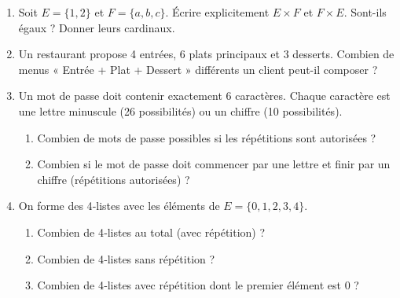 \documentclass[11pt]{article}
\begin{document}
\begin{exercice}
\begin{enumerate}
    \item Soit $E = \{1,2\}$ et $F = \{a,b,c\}$. Écrire explicitement $E \times F$ et $F \times E$. Sont-ils égaux ? Donner leurs cardinaux.
    \item Un restaurant propose 4 entrées, 6 plats principaux et 3 desserts. Combien de menus « Entrée + Plat + Dessert » différents un client peut-il composer ?
    \item Un mot de passe doit contenir exactement 6 caractères. Chaque caractère est une lettre minuscule (26 possibilités) ou un chiffre (10 possibilités).
    \begin{enumerate}
        \item Combien de mots de passe possibles si les répétitions sont autorisées ?
        \item Combien si le mot de passe doit commencer par une lettre et finir par un chiffre (répétitions autorisées) ?
    \end{enumerate}
    \item On forme des 4‑listes avec les éléments de $E = \{0, 1, 2, 3, 4\}$.
    \begin{enumerate}
        \item Combien de 4‑listes au total (avec répétition) ?
        \item Combien de 4‑listes sans répétition ?
        \item Combien de 4‑listes avec répétition dont le premier élément est 0 ?
    \end{enumerate}
\end{enumerate}
\end{exercice}
\end{document}
